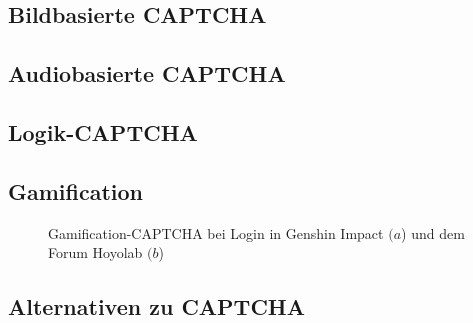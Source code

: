 \subsection{Bildbasierte CAPTCHA}
\subsection{Audiobasierte CAPTCHA}
\subsection{Logik-CAPTCHA}
\subsection{Gamification}

\begin{figure}
    \centering
    \qquad
    \caption{Gamification-CAPTCHA bei Login in Genshin Impact $(a$) und dem Forum Hoyolab $(b$)}   
\end{figure}

\subsection{Alternativen zu CAPTCHA}
